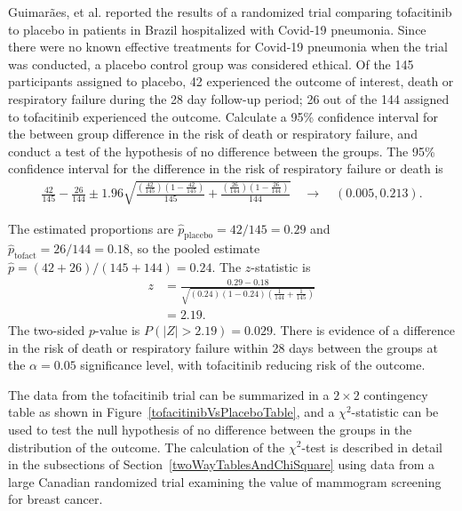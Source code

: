 \begin{examplewrap}
  \begin{nexample}{Guimar\~{a}es, et al.  reported the results of a randomized trial comparing tofacitinib to placebo in patients in Brazil hospitalized with Covid-19 pneumonia.  Since there were no known effective treatments for Covid-19 pneumonia when the trial was conducted, a placebo control group was considered ethical.  Of the 145 participants assigned to placebo, 42 experienced the outcome of interest, death or respiratory failure during the 28 day follow-up period; 26 out of the 144 assigned to tofacitinib experienced the outcome. Calculate a 95\% confidence interval for the between group difference in the risk of death or respiratory failure, and conduct a test of the hypothesis of no difference between the groups.}
\label{tofacitinibVsPlacebo}
The 95\% confidence interval for the difference in the risk of respiratory failure or death is 
\begin{align*}
   \frac{42}{145} - \frac{26}{144} \pm 1.96  \sqrt{\frac{(\frac{42}{145})(1 - \frac{42}{145})}{145} 
   + \frac{(\frac{26}{144})(1 - \frac{26}{144})}{144}} \quad \to \quad (0.005, 0.213).
\end{align*}

The estimated proportions are $\hat{p}_{\text{placebo}} = 42/145 = 0.29$ and $\hat{p}_{\text{tofact}} = 26/144 = 0.18$, so the pooled estimate $\hat{p} = (42 + 26)/(145 + 144) = 0.24$.  The $z$-statistic is
\begin{align*}
  z &= \frac{0.29 - 0.18}{\sqrt{(0.24)(1-0.24)\left(\frac{1}{144} + \frac{1}{145} \right)}} \\
    &= 2.19.
\end{align*}
The two-sided $p$-value is $P(|Z| > 2.19) = 0.029$. There is evidence of a difference in the risk of death or respiratory failure within 28 days between the groups at the $\alpha = 0.05$ significance level, with tofacitinib reducing risk of the outcome.
  \end{nexample}
\end{examplewrap}

The data from the tofacitinib trial can be summarized in a $2 \times 2$ contingency table as shown in Figure~\ref{tofacitinibVsPlaceboTable}, and a $\chi^2$-statistic can be used to test the null hypothesis of no difference between the groups in the distribution of the outcome.  The calculation of the $\chi^2$-test is described in detail in the subsections of Section~\ref{twoWayTablesAndChiSquare} using data from a large Canadian randomized trial examining the value of mammogram screening for breast cancer.

